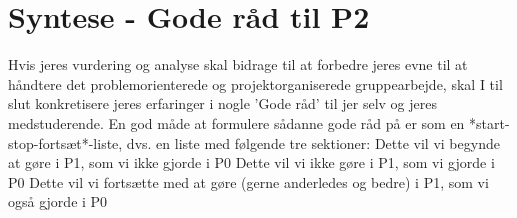 \documentclass[a4paper,12pt, article]{memoir}
\begin{document}
    \section{Syntese - Gode råd til P2}
    Hvis jeres vurdering og analyse skal bidrage til at forbedre jeres evne til at håndtere det 
    problemorienterede og projektorganiserede gruppearbejde, skal I til slut konkretisere jeres 
    erfaringer i nogle ’Gode råd’ til jer selv og jeres medstuderende. En god måde at formulere sådanne 
    gode råd på er som en *start-stop-fortsæt*-liste, dvs. en liste med følgende tre sektioner: 
    Dette vil vi begynde at gøre i P1, som vi ikke gjorde i P0 
    Dette vil vi ikke gøre i P1, som vi gjorde i P0 
    Dette vil vi fortsætte med at gøre (gerne anderledes og bedre) i P1, som vi også gjorde i P0 
\end{document}
